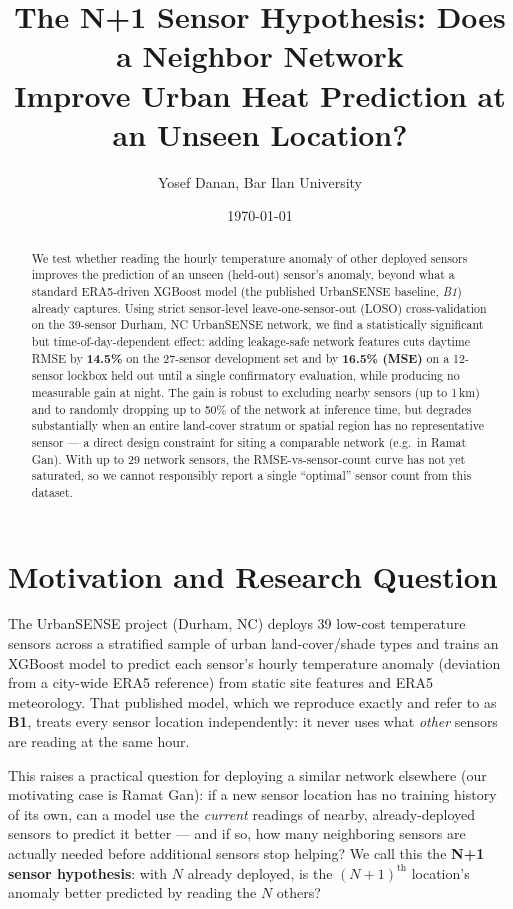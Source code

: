 \documentclass[11pt]{article}
\title{The N+1 Sensor Hypothesis: Does a Neighbor Network\\
Improve Urban Heat Prediction at an Unseen Location?}
\author{Yosef Danan, Bar Ilan University}
\date{\today}
\begin{document}
\maketitle

\begin{abstract}
We test whether reading the hourly temperature anomaly of other deployed
sensors improves the prediction of an unseen (held-out) sensor's anomaly,
beyond what a standard ERA5-driven XGBoost model (the published UrbanSENSE
baseline, \emph{B1}) already captures. Using strict sensor-level
leave-one-sensor-out (LOSO) cross-validation on the 39-sensor Durham, NC
UrbanSENSE network, we find a statistically significant but
time-of-day-dependent effect: adding leakage-safe network features cuts
daytime RMSE by \textbf{14.5\%} on the 27-sensor development set and by
\textbf{16.5\% (MSE)} on a 12-sensor lockbox held out until a single
confirmatory evaluation, while producing no measurable gain at night. The
gain is robust to excluding nearby sensors (up to 1\,km) and to randomly
dropping up to 50\% of the network at inference time, but degrades
substantially when an entire land-cover stratum or spatial region has no
representative sensor --- a direct design constraint for siting a comparable
network (e.g.\ in Ramat Gan). With up to 29 network sensors, the
RMSE-vs-sensor-count curve has not yet saturated, so we cannot responsibly
report a single ``optimal'' sensor count from this dataset.
\end{abstract}

\section{Motivation and Research Question}

The UrbanSENSE project (Durham, NC) deploys 39 low-cost temperature sensors
across a stratified sample of urban land-cover/shade types and trains an
XGBoost model to predict each sensor's hourly temperature anomaly (deviation
from a city-wide ERA5 reference) from static site features and ERA5
meteorology. That published model, which we reproduce exactly and refer to
as \textbf{B1}, treats every sensor location independently: it never uses
what \emph{other} sensors are reading at the same hour.

This raises a practical question for deploying a similar network elsewhere
(our motivating case is Ramat Gan): if a new sensor location has no training
history of its own, can a model use the \emph{current} readings of nearby,
already-deployed sensors to predict it better --- and if so, how many
neighboring sensors are actually needed before additional sensors stop
helping? We call this the \textbf{N+1 sensor hypothesis}: with $N$ already
deployed, is the $(N{+}1)^{\text{th}}$ location's anomaly better predicted by
reading the $N$ others?
\end{document}
